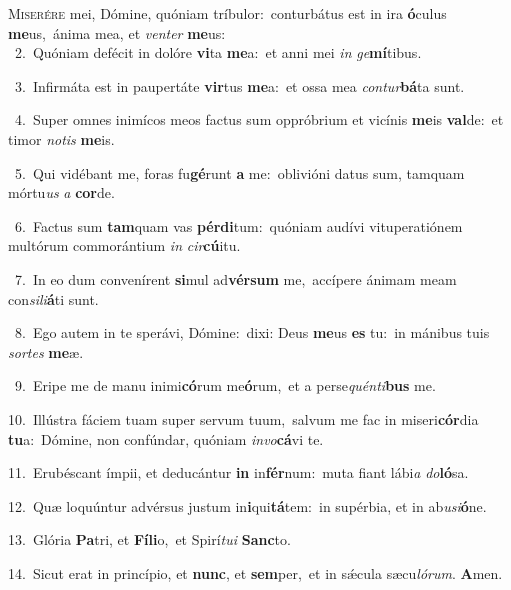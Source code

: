\lettrine{\initial\textcolor{\initialcolor}{M}}{iserére} mei, Dómine, quóniam tríbulor:~\dagger conturbátus est in ira \textbf{ó}\-culus \textbf{me}\-us,~\star ánima mea, et \textit{ven}\-\textit{ter} \textbf{me}\-us:\\
{\numbfont\textcolor{\numbcolor}{~2.}}~Quóniam defécit in dolóre \textbf{vi}\-ta \textbf{me}\-a:~\star et anni mei \textit{in} \textit{ge}\-\textbf{mí}tibus.\par
{\numbfont\textcolor{\numbcolor}{~3.}}~Infirmáta est in paupertáte \textbf{vir}\-tus \textbf{me}\-a:~\star et ossa mea \textit{con}\-\textit{tur}\textbf{bá}ta sunt.\par
{\numbfont\textcolor{\numbcolor}{~4.}}~Super omnes inimícos meos factus sum oppróbrium et vicínis \textbf{me}\-is \textbf{val}\-de:~\star et timor \textit{no}\-\textit{tis} \textbf{me}\-is.\par
{\numbfont\textcolor{\numbcolor}{~5.}}~Qui vidébant me, foras fu\-\textbf{gé}\-runt \textbf{a} me:~\star oblivióni datus sum, tamquam mórtu\textit{us} \textit{a} \textbf{cor}\-de.\par
{\numbfont\textcolor{\numbcolor}{~6.}}~Factus sum \textbf{tam}\-quam vas \textbf{pér}\-\textbf{di}tum:~\star quóniam audívi vituperatiónem multórum commorántium \textit{in} \textit{cir}\-\textbf{cú}itu.\par
{\numbfont\textcolor{\numbcolor}{~7.}}~In eo dum convenírent \textbf{si}\-mul ad\-\textbf{vér}\-\textbf{sum} me,~\star accípere ánimam meam con\-\textit{si}\-\textit{li}\textbf{á}ti sunt.\par
{\numbfont\textcolor{\numbcolor}{~8.}}~Ego autem in te sperávi, Dómine:~\dagger dixi: Deus \textbf{me}\-us \textbf{es} tu:~\star in mánibus tuis \textit{sor}\-\textit{tes} \textbf{me}\-æ.\par
{\numbfont\textcolor{\numbcolor}{~9.}}~Eripe me de manu inimi\-\textbf{có}\-rum me\-\textbf{ó}\-rum,~\star et a perse\-\textit{quén}\-\textit{ti}\textbf{bus} me.\par
{\numbfont\textcolor{\numbcolor}{10.}}~Illústra fáciem tuam super servum tuum,~\dagger salvum me fac in miseri\-\textbf{cór}\-dia \textbf{tu}\-a:~\star Dómine, non confúndar, quóniam \textit{in}\-\textit{vo}\textbf{cá}vi te.\par
{\numbfont\textcolor{\numbcolor}{11.}}~Erubéscant ímpii, et deducántur \textbf{in} in\-\textbf{fér}\-num:~\star muta fiant lábi\textit{a} \textit{do}\-\textbf{ló}sa.\par
{\numbfont\textcolor{\numbcolor}{12.}}~Quæ loquúntur advérsus justum in\-\textbf{i}\-qui\-\textbf{tá}\-tem:~\star in supérbia, et in ab\-\textit{u}\-\textit{si}\textbf{ó}ne.\par
{\numbfont\textcolor{\numbcolor}{13.}}~Glória \textbf{Pa}\-tri, et \textbf{Fí}\-\textbf{li}o,~\star et Spirí\-\textit{tu}\-\textit{i} \textbf{Sanc}\-to.\par
{\numbfont\textcolor{\numbcolor}{14.}}~Sicut erat in princípio, et \textbf{nunc}\-, et \textbf{sem}\-per,~\star et in sǽcula sæcu\-\textit{ló}\-\textit{rum}. \textbf{A}\-men.\par
